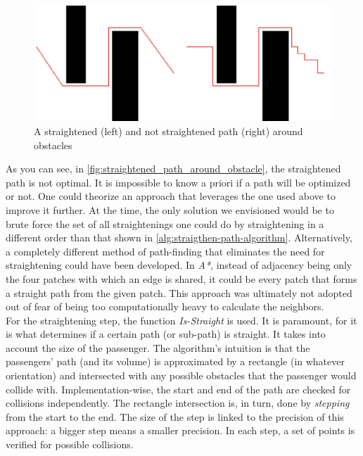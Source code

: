 \begin{figure}[H]
    \centering
    \includegraphics[width=\columnwidth]{assets/obstacle_path.png}
    \caption{A straightened (left) and not straightened path (right) around obstacles}
    \label{fig:straightened_path_around_obstacle}
\end{figure}

As you can see, in \autoref{fig:straightened_path_around_obstacle}, the straightened path is not optimal. It is impossible to know a priori if a path will be optimized or not. One could theorize an approach that leverages the one used above to improve it further. At the time, the only solution we envisioned would be to brute force the set of all straightenings one could do by straightening in a different order than that shown in \autoref{alg:straigthen-path-algorithm}. Alternatively, a completely different method of path-finding that eliminates the need for straightening could have been developed. In \textit{A*}, instead of adjacency being only the four patches with which an edge is shared, it could be every patch that forms a straight path from the given patch. This approach was ultimately not adopted out of fear of being too computationally heavy to calculate the neighbors. \\

For the straightening step, the function \textit{Is-Straight} is used. It is paramount, for it is what determines if a certain path (or sub-path) is straight. It takes into account the size of the passenger. The algorithm's intuition is that the passengers' path (and its volume) is approximated by a rectangle (in whatever orientation) and intersected with any possible obstacles that the passenger would collide with. Implementation-wise, the start and end of the path are checked for collisions independently. The rectangle intersection is, in turn, done by \textit{stepping} from the start to the end. The size of the step is linked to the precision of this approach: a bigger step means a smaller precision. In each step, a set of points is verified for possible collisions.\\

